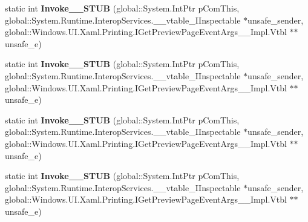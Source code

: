 \begin{DoxyCompactItemize}
\item 
\mbox{\label{struct_windows_1_1_u_i_1_1_xaml_1_1_printing_1_1_get_preview_page_event_handler_____impl_1_1_vtbl_ad68bac72d5a24eec5e88db46ab1e37a1}} 
static int {\bfseries Invoke\+\_\+\+\_\+\+S\+T\+UB} (global\+::\+System.\+Int\+Ptr p\+Com\+This, global\+::\+System.\+Runtime.\+Interop\+Services.\+\_\+\+\_\+vtable\+\_\+\+I\+Inspectable $\ast$unsafe\+\_\+sender, global\+::\+Windows.\+U\+I.\+Xaml.\+Printing.\+I\+Get\+Preview\+Page\+Event\+Args\+\_\+\+\_\+\+Impl.\+Vtbl $\ast$$\ast$unsafe\+\_\+e)
\item 
\mbox{\label{struct_windows_1_1_u_i_1_1_xaml_1_1_printing_1_1_get_preview_page_event_handler_____impl_1_1_vtbl_ad68bac72d5a24eec5e88db46ab1e37a1}} 
static int {\bfseries Invoke\+\_\+\+\_\+\+S\+T\+UB} (global\+::\+System.\+Int\+Ptr p\+Com\+This, global\+::\+System.\+Runtime.\+Interop\+Services.\+\_\+\+\_\+vtable\+\_\+\+I\+Inspectable $\ast$unsafe\+\_\+sender, global\+::\+Windows.\+U\+I.\+Xaml.\+Printing.\+I\+Get\+Preview\+Page\+Event\+Args\+\_\+\+\_\+\+Impl.\+Vtbl $\ast$$\ast$unsafe\+\_\+e)
\item 
\mbox{\label{struct_windows_1_1_u_i_1_1_xaml_1_1_printing_1_1_get_preview_page_event_handler_____impl_1_1_vtbl_ad68bac72d5a24eec5e88db46ab1e37a1}} 
static int {\bfseries Invoke\+\_\+\+\_\+\+S\+T\+UB} (global\+::\+System.\+Int\+Ptr p\+Com\+This, global\+::\+System.\+Runtime.\+Interop\+Services.\+\_\+\+\_\+vtable\+\_\+\+I\+Inspectable $\ast$unsafe\+\_\+sender, global\+::\+Windows.\+U\+I.\+Xaml.\+Printing.\+I\+Get\+Preview\+Page\+Event\+Args\+\_\+\+\_\+\+Impl.\+Vtbl $\ast$$\ast$unsafe\+\_\+e)
\item 
\mbox{\label{struct_windows_1_1_u_i_1_1_xaml_1_1_printing_1_1_get_preview_page_event_handler_____impl_1_1_vtbl_ad68bac72d5a24eec5e88db46ab1e37a1}} 
static int {\bfseries Invoke\+\_\+\+\_\+\+S\+T\+UB} (global\+::\+System.\+Int\+Ptr p\+Com\+This, global\+::\+System.\+Runtime.\+Interop\+Services.\+\_\+\+\_\+vtable\+\_\+\+I\+Inspectable $\ast$unsafe\+\_\+sender, global\+::\+Windows.\+U\+I.\+Xaml.\+Printing.\+I\+Get\+Preview\+Page\+Event\+Args\+\_\+\+\_\+\+Impl.\+Vtbl $\ast$$\ast$unsafe\+\_\+e)

\end{DoxyCompactItemize}
